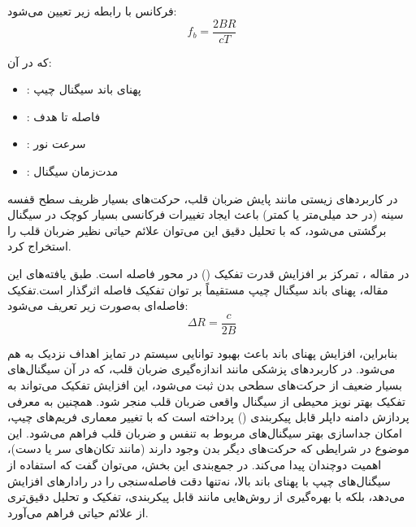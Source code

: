 فرکانس  با رابطه زیر تعیین می‌شود:
\begin{equation}
f_b = \frac{2BR}{cT}
\label{eq:beat_frequency}
\end{equation}

که در آن:
\begin{itemize}
    \item {}: پهنای باند سیگنال چیپ
    \item {}: فاصله تا هدف
    \item {}: سرعت نور
    \item {}: مدت‌زمان سیگنال
\end{itemize}

 در کاربردهای زیستی مانند پایش ضربان قلب، حرکت‌های بسیار ظریف سطح قفسه سینه (در حد میلی‌متر یا کمتر) باعث ایجاد تغییرات فرکانسی بسیار کوچک در سیگنال برگشتی می‌شود، که با تحلیل دقیق این  می‌توان علائم حیاتی نظیر ضربان قلب را استخراج کرد.
\cite{munoz2018doppler}

در مقاله \cite{neemat2019reconfigurable}، تمرکز بر افزایش قدرت تفکیک () در محور فاصله است. طبق یافته‌های این مقاله، پهنای باند سیگنال چیپ مستقیماً بر توان تفکیک فاصله اثرگذار است.تفکیک فاصله‌ای  به‌صورت زیر تعریف می‌شود:
\begin{equation}
\Delta R = \frac{c}{2B}
\label{eq:range_resolution}
\end{equation}

بنابراین، افزایش پهنای باند باعث بهبود توانایی سیستم در تمایز اهداف نزدیک به هم می‌شود. در کاربردهای پزشکی مانند اندازه‌گیری ضربان قلب، که در آن سیگنال‌های بسیار ضعیف از حرکت‌های سطحی بدن ثبت می‌شود، این افزایش تفکیک می‌تواند به تفکیک بهتر نویز محیطی از سیگنال واقعی ضربان قلب منجر شود.
همچنین به معرفی پردازش دامنه داپلر قابل پیکربندی (\cite{neemat2019reconfigurable}) پرداخته است که با تغییر معماری فریم‌های چیپ، امکان جداسازی بهتر سیگنال‌های مربوط به تنفس و ضربان قلب فراهم می‌شود. این موضوع در شرایطی که حرکت‌های دیگر بدن وجود دارند (مانند تکان‌های سر یا دست)، اهمیت دوچندان پیدا می‌کند.
در جمع‌بندی این بخش، می‌توان گفت که استفاده از سیگنال‌های چیپ با پهنای باند بالا، نه‌تنها دقت فاصله‌سنجی را در رادارهای  افزایش می‌دهد، بلکه با بهره‌گیری از روش‌هایی مانند  قابل پیکربندی، تفکیک و تحلیل دقیق‌تری از علائم حیاتی فراهم می‌آورد.



